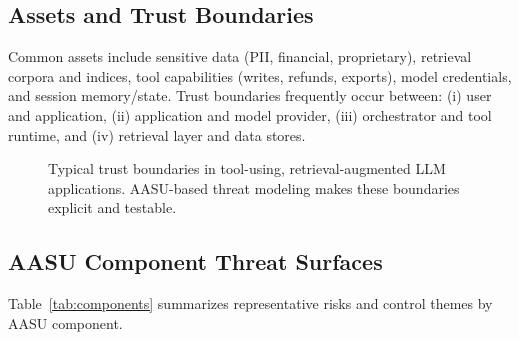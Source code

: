 \documentclass[11pt]{article}
\newcommand{\AASU}{\textsc{AASU}}
\begin{document}
\subsection{Assets and Trust Boundaries}
Common assets include sensitive data (PII, financial, proprietary), retrieval corpora and indices, tool capabilities (writes, refunds, exports),
model credentials, and session memory/state. Trust boundaries frequently occur between:
(i) user and application, (ii) application and model provider, (iii) orchestrator and tool runtime, and (iv) retrieval layer and data stores.

\begin{figure}[t]
  \centering
  \caption{Typical trust boundaries in tool-using, retrieval-augmented LLM applications. \AASU{}-based threat modeling makes these boundaries explicit and testable.}
  \label{fig:trust}
\end{figure}

\subsection{\AASU{} Component Threat Surfaces}
Table~\ref{tab:components} summarizes representative risks and control themes by \AASU{} component.
\end{document}
